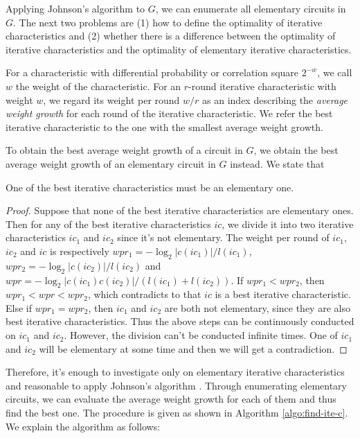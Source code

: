 Applying Johnson's algorithm \cite{johnson1975finding} to $G$, we can enumerate all elementary circuits in $G$. The next two problems are (1) how to define the optimality of iterative characteristics and (2) whether there is a difference between the optimality of iterative characteristics and the optimality of elementary iterative characteristics. 

For a characteristic with differential probability or correlation square $2^{-w}$, we call $w$ the weight of the characteristic. For an $r$-round iterative characteristic with weight $w$, we regard its weight per round $w/r$ as an index describing the \textit{average weight growth} for each round of the iterative characteristic. We refer the best iterative characteristic to the one with the smallest average weight growth. 

To obtain the best average weight growth of a circuit in $G$, we obtain the best average weight growth of an elementary circuit in $G$ instead. We state that
\begin{theorem}
    One of the best iterative characteristics must be an elementary one.
\end{theorem}
\begin{proof}
    Suppose that none of the best iterative characteristics are elementary ones. Then for any of the best iterative characteristics $ic$, we divide it into two iterative characteristics $ic_1$ and $ic_2$ since it's not elementary. The weight per round of $ic_1$, $ic_2$ and $ic$ is respectively $wpr_1=-\log_2|c(ic_1)|/l(ic_1)$, $wpr_2=-\log_2|c(ic_2)|/l(ic_2)$ and $wpr=-\log_2|c(ic_1)c(ic_2)|/(l(ic_1)+l(ic_2))$. If $wpr_1< wpr_2$, then $wpr_1<wpr<wpr_2$, which contradicts to that $ic$ is a best iterative characteristic. Else if $wpr_1=wpr_2$, then $ic_1$ and $ic_2$ are both not elementary, since they are also best iterative characteristics. Thus the above steps can be continuously conducted on $ic_1$ and $ic_2$. However, the division can't be conducted infinite times. One of $ic_1$ and $ic_2$ will be elementary at some time and then we will get a contradiction.
\end{proof}

Therefore, it's enough to investigate only on elementary iterative characteristics and reasonable to apply Johnson's algorithm \cite{johnson1975finding}. Through enumerating elementary circuits, we can evaluate the average weight growth for each of them and thus find the best one. The procedure is given as shown in Algorithm \ref{algo:find-ite-c}. We explain the algorithm as follows: 

